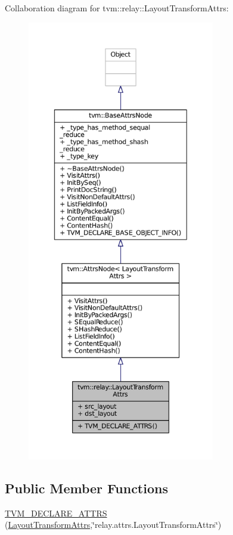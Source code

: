 Collaboration diagram for tvm\+:\+:relay\+:\+:Layout\+Transform\+Attrs\+:
\nopagebreak
\begin{figure}[H]
\begin{center}
\leavevmode
\includegraphics[height=550pt]{structtvm_1_1relay_1_1LayoutTransformAttrs__coll__graph}
\end{center}
\end{figure}
\subsection*{Public Member Functions}
\begin{DoxyCompactItemize}
\item 
\hyperlink{structtvm_1_1relay_1_1LayoutTransformAttrs_a9e39ae3c7dccea1087b6caaed7563b94}{T\+V\+M\+\_\+\+D\+E\+C\+L\+A\+R\+E\+\_\+\+A\+T\+T\+RS} (\hyperlink{structtvm_1_1relay_1_1LayoutTransformAttrs}{Layout\+Transform\+Attrs},\char`\"{}relay.\+attrs.\+Layout\+Transform\+Attrs\char`\"{})
\end{DoxyCompactItemize}
